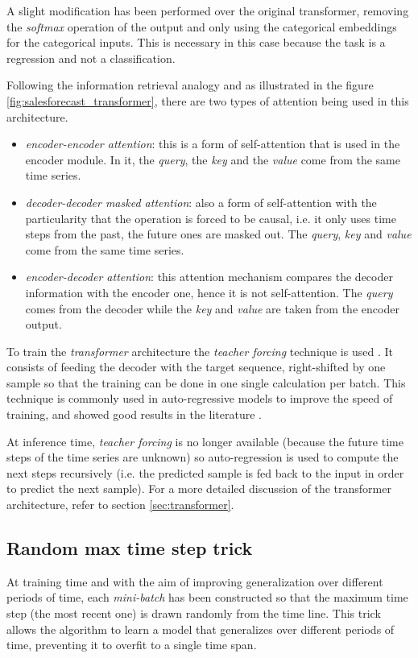 A slight modification has been performed over the original transformer, removing the \textit{softmax} operation of the output and only using the categorical embeddings for the categorical inputs. This is necessary in this case because the task is a regression and not a classification.

Following the information retrieval analogy and as illustrated in the figure \ref{fig:salesforecast_transformer}, there are two types of attention being used in this architecture.
\begin{itemize}
	\item \textit{encoder-encoder attention}: this is a form of self-attention that is used in the encoder module. In it, the \textit{query}, the \textit{key} and the \textit{value} come from the same time series.
	\item \textit{decoder-decoder masked attention}: also a form of self-attention with the particularity that the operation is forced to be causal, i.e. it only uses time steps from the past, the future ones are masked out. The \textit{query}, \textit{key} and \textit{value} come from the same time series.
	\item \textit{encoder-decoder attention}: this attention mechanism compares the decoder information with the encoder one, hence it is not self-attention. The \textit{query} comes from the decoder while the \textit{key} and \textit{value} are taken from the encoder output.
\end{itemize}

To train the \textit{transformer} architecture the \textit{teacher forcing} technique is used \autocite{williams1989, Goyal2016}. It consists of feeding the decoder with the target sequence, right-shifted by one sample so that the training can be done in one single calculation per batch. This technique is commonly used in auto-regressive models to improve the speed of training, and showed good results in the literature \autocite{vaswani2017}. 

At inference time, \textit{teacher forcing} is no longer available (because the future time steps of the time series are unknown) so auto-regression is used to compute the next steps recursively (i.e. the predicted sample is fed back to the input in order to predict the next sample). For a more detailed discussion of the transformer architecture, refer to section \ref{sec:transformer}.


\subsection{Random max time step trick}
At training time and with the aim of improving generalization over different periods of time, each \textit{mini-batch} has been constructed so that the maximum time step (the most recent one)  is drawn randomly from the time line. This trick allows the algorithm to learn a model that generalizes over different periods of time, preventing it to overfit to a single time span.

